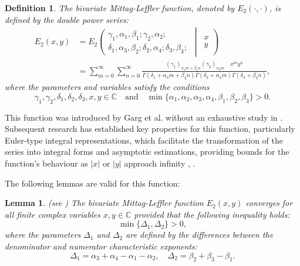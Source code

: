 \documentclass{amsart}
\numberwithin{equation}{section}
\newtheorem{lem}[thm]{Lemma}
\newtheorem{defin}[thm]{Definition}
\begin{document}
\begin{defin}
    The bivariate Mittag-Leffler function, denoted by $E_2(\cdot,\cdot)$, is defined by the double power series:
\begin{align*}
   E_2(x,y)&= E_2 \left( 
    \begin{matrix} 
    \gamma_1, \alpha_1, \beta_1; \gamma_2, \alpha_2; \\ 
    \delta_1, \alpha_3, \beta_2; \delta_2, \alpha_4; \delta_3, \beta_3; 
    \end{matrix} 
    \, \middle| \, 
    \begin{matrix} 
    x \\ y 
    \end{matrix} 
    \right) \\&= \sum_{m=0}^{\infty}\sum_{n=0}^\infty \frac{(\gamma_1)_{\alpha_1 m + \beta_1 n} (\gamma_2)_{\alpha_2 m} \quad x^m y^n}{\Gamma(\delta_1 + \alpha_3 m + \beta_2 n) \Gamma(\delta_2 + \alpha_4 m) \Gamma(\delta_3 + \beta_3 n)},
\end{align*}
where the parameters and variables satisfy the conditions \begin{equation*}
\gamma_1, \gamma_2, \delta_1, \delta_2, \delta_3, x, y \in \mathbb{C} \quad \text{and} \quad \min\{\alpha_1, \alpha_2, \alpha_3, \alpha_4, \beta_1, \beta_2, \beta_3\} > 0.
\end{equation*} \label{jumaeva:def:3}
\end{defin}
This function was introduced by Garg et al. without an exhaustive study in \cite{jumaeva:ref:26}. Subsequent research has established key properties for this function, particularly Euler-type integral representations, which facilitate the transformation of the series into integral forms \cite{jumaeva:ref:27} 
and asymptotic estimations, providing bounds for the function's behaviour as $|x|$ or $|y|$ approach infinity \cite{jumaeva:ref:28}, \cite{jumaeva:ref:29}.

The following lemmas are valid for this function:
\begin{lem}(see \cite{jumaeva:ref:30})
The bivariate Mittag-Leffler  function $E_2(x,y)$ converges for all finite complex variables $x, y \in \mathbb{C}$ provided that the following inequality holds:
\begin{equation}\label{jumaeva:eq:6}
    \min \{ \Delta_1, \Delta_2 \} > 0,
\end{equation}
where the parameters $\Delta_1$ and $\Delta_2$ are defined by the differences between the denominator and numerator characteristic exponents:
\begin{equation*}
    \Delta_1 = \alpha_3 + \alpha_4 - \alpha_1 - \alpha_2, \quad
    \Delta_2 = \beta_2 + \beta_3 - \beta_1.
\end{equation*}\label{jumaeva:lem:3}
\end{lem}
\end{document}
